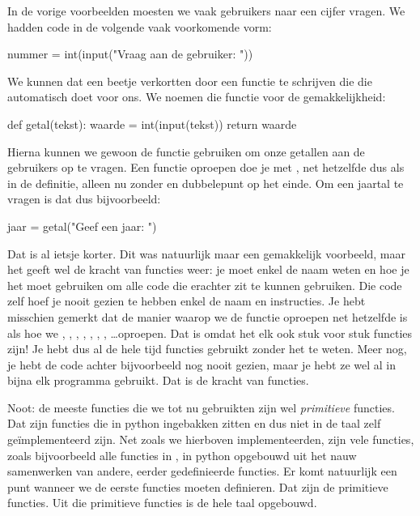   In de vorige voorbeelden moesten we vaak gebruikers naar een cijfer vragen.
  We hadden code in de volgende vaak voorkomende vorm:
  \begin{python}
    nummer = int(input("Vraag aan de gebruiker: "))
  \end{python}
  We kunnen dat een beetje verkortten door een functie te schrijven die die
   automatisch doet voor ons. We noemen die functie
   voor de gemakkelijkheid:
  \begin{python}
    def getal(tekst):
      waarde = int(input(tekst))
      return waarde
  \end{python}
  Hierna kunnen we gewoon de functie  gebruiken om onze getallen aan
  de gebruikers op te vragen. Een functie oproepen doe je met
  , net hetzelfde dus als in de definitie,
  alleen nu zonder  en dubbelepunt op het einde. Om een jaartal te
  vragen is dat dus bijvoorbeeld:
  \begin{python}
    jaar = getal("Geef een jaar: ")
  \end{python}
  Dat is al ietsje korter. Dit was natuurlijk maar een gemakkelijk voorbeeld,
  maar het geeft wel de kracht van functies weer: je moet enkel de naam weten en
  hoe je het moet gebruiken om alle code die erachter zit te kunnen gebruiken.
  Die code zelf hoef je nooit gezien te hebben enkel de naam en instructies. Je
  hebt misschien gemerkt dat de manier waarop we de functie  oproepen
  net hetzelfde is als hoe we , , , ,
  , , , \ldots oproepen. Dat is omdat het elk ook
  stuk voor stuk functies zijn! Je hebt dus al de hele tijd functies gebruikt
  zonder het te weten. Meer nog, je hebt de code achter bijvoorbeeld 
  nog nooit gezien, maar je hebt ze wel al in bijna elk programma gebruikt. Dat
  is de kracht van functies.

  Noot: de meeste functies die we tot nu gebruikten zijn wel \emph{primitieve}
  functies. Dat zijn functies die in python ingebakken zitten en dus niet in de
  taal zelf ge\"implementeerd zijn.
  Net zoals we hierboven  implementeerden, zijn vele
  functies, zoals bijvoorbeeld alle functies in , in python opgebouwd
  uit het nauw samenwerken van andere, eerder gedefinieerde functies. Er komt
  natuurlijk een punt wanneer we de eerste functies moeten definieren. Dat zijn
  de primitieve functies. Uit die primitieve functies is de hele taal opgebouwd.

